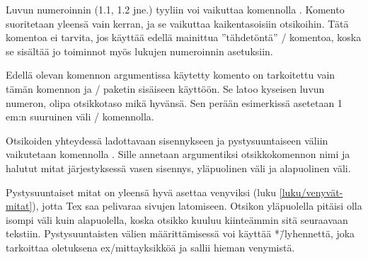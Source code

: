 Luvun numeroinnin (1.1, 1.2 jne.) tyyliin voi vaikuttaa komennolla
. Komento suoritetaan yleensä vain kerran, ja se
vaikuttaa kaikentasoisiin otsikoihin. Tätä komentoa ei tarvita, jos
käyttää edellä mainittua ''tähdetöntä'' \-/
komentoa, koska se sisältää jo toiminnot myös lukujen numeroinnin
asetuksiin.

\begin{koodilohkosis}
\titlelabel{\thetitle\hspace{1em}}
\end{koodilohkosis}

\noindent
Edellä olevan komennon argumentissa käytetty komento 
on tarkoitettu vain tämän komennon ja \-/ paketin
sisäiseen käyttöön. Se latoo kyseisen luvun numeron, olipa otsikkotaso
mikä hyvänsä. Sen perään esimerkissä asetetaan 1\,em:n suuruinen väli
\-/ komennolla.

Otsikoiden yhteydessä ladottavaan sisennykseen ja pystysuuntaiseen
väliin vaikutetaan komennolla . Sille annetaan
argumentiksi otsikkokomennon nimi ja halutut mitat järjestyksessä vasen
sisennys, yläpuolinen väli ja alapuolinen väli.

\begin{koodilohkosis}
\end{koodilohkosis}

\noindent
Pystysuuntaiset mitat on yleensä hyvä asettaa venyviksi (luku
\ref{luku/venyvät-mitat}), jotta Tex saa pelivaraa sivujen latomiseen.
Otsikon yläpuolella pitäisi olla isompi väli kuin alapuolella, koska
otsikko kuuluu kiinteämmin sitä seuraavaan tekstiin. Pystysuuntaisten
välien määrittämisessä voi käyttää *\=/lyhennettä, joka tarkoittaa
oletuksena ex\-/mittayksikköä ja sallii hieman venymistä.

\begin{koodilohkosis}
\end{koodilohkosis}


